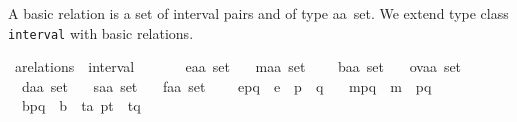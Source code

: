 \documentclass{llncs}
\begin{document}
A basic relation is a set of interval pairs  and of type {\isacharparenleft}{\isacharprime}a{\isasymtimes}{\isacharprime}a{\isacharparenright}\ set.  We extend type class \texttt{interval} with basic relations. %
\begin{isabellebody}
\isanewline
{}\isamarkupfalse%
\ arelations\ {\isacharequal}\ interval\ {\isacharplus}\ \isanewline
\ \ \isanewline
\ \ e{\isacharcolon}{\isacharcolon}{\isachardoublequoteopen}{\isacharparenleft}{\isacharprime}a{\isasymtimes}{\isacharprime}a{\isacharparenright}\ set{\isachardoublequoteclose}\ \isanewline
\ \ m{\isacharcolon}{\isacharcolon}{\isachardoublequoteopen}{\isacharparenleft}{\isacharprime}a{\isasymtimes}{\isacharprime}a{\isacharparenright}\ set{\isachardoublequoteclose}\ \ \isanewline
\ \ b{\isacharcolon}{\isacharcolon}{\isachardoublequoteopen}{\isacharparenleft}{\isacharprime}a{\isasymtimes}{\isacharprime}a{\isacharparenright}\ set{\isachardoublequoteclose}\ \isanewline
\ \ ov{\isacharcolon}{\isacharcolon}{\isachardoublequoteopen}{\isacharparenleft}{\isacharprime}a{\isasymtimes}{\isacharprime}a{\isacharparenright}\ set{\isachardoublequoteclose}\ \isanewline
\ \ d{\isacharcolon}{\isacharcolon}{\isachardoublequoteopen}{\isacharparenleft}{\isacharprime}a{\isasymtimes}{\isacharprime}a{\isacharparenright}\ set{\isachardoublequoteclose}\ \isanewline
\ \ s{\isacharcolon}{\isacharcolon}{\isachardoublequoteopen}{\isacharparenleft}{\isacharprime}a{\isasymtimes}{\isacharprime}a{\isacharparenright}\ set{\isachardoublequoteclose}\ \isanewline
\ \ f{\isacharcolon}{\isacharcolon}{\isachardoublequoteopen}{\isacharparenleft}{\isacharprime}a{\isasymtimes}{\isacharprime}a{\isacharparenright}\ set{\isachardoublequoteclose}\ \ \isanewline
{}\isanewline
\ \ e{\isacharcolon}{\isachardoublequoteopen}{\isacharparenleft}p{\isacharcomma}q{\isacharparenright}\ {\isasymin}\ e\ {\isacharequal}\ {\isacharparenleft}p\ {\isacharequal}\ q{\isacharparenright}{\isachardoublequoteclose}\ \isanewline
\ \ m{\isacharcolon}{\isachardoublequoteopen}{\isacharparenleft}p{\isacharcomma}q{\isacharparenright}\ {\isasymin}\ m\ {\isacharequal}\ p{\isasymparallel}q{\isachardoublequoteclose}\ \isanewline
\ \ b{\isacharcolon}{\isachardoublequoteopen}{\isacharparenleft}p{\isacharcomma}q{\isacharparenright}\ {\isasymin}\ b\ {\isacharequal}\ {\isacharparenleft}{\isasymexists}t{\isacharcolon}{\isacharcolon}{\isacharprime}a{\isachardot}\ p{\isasymparallel}t\ {\isasymand}\ t{\isasymparallel}q{\isacharparenright}{\isachardoublequoteclose}\ \isanewline

\end{isabellebody}
\end{document}
